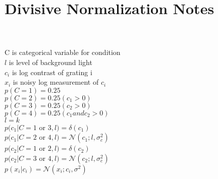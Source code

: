 \documentclass[12pt]{article}
\begin{document}
\section*{Divisive Normalization Notes}

\\
\\
C is categorical variable for condition\\
$l$ is level of background light\\
$c_i$ is log contrast of grating i\\
$x_i$ is noisy log measurement of $c_i$\\
$p(C=1) = 0.25$\\
$p(C=2) = 0.25 (c_1 > 0)$\\
$p(C=3) = 0.25 (c_2 > 0)$\\
$p(C=4) = 0.25 (c_1 and c_2 > 0)$\\
$l = k$\\
$p(c_1|C=1$ or $3, l) = \delta(c_1)$\\
$p(c_1|C= 2$ or $4, l) = \mathcal{N}(c_1; l, \sigma_c^2)$\\
$p(c_2|C=1$ or $2, l) = \delta(c_2)$\\
$p(c_2|C=3$ or $4, l) = \mathcal{N}(c_2; l, \sigma_c^2)$\\
$p(x_i|c_i) = \mathcal{N}(x_i; c_i, \sigma^2)$
\end{document}
